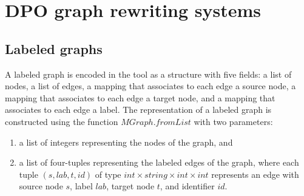\section{DPO graph rewriting systems}
\label{lyonparallel:sec:implementation_of_dpo_graph_rewriting_systems}
\subsection{Labeled graphs}
\label{lyonparallel:sec:labeled_graphs}
A labeled graph is encoded in the tool as a structure with five fields: a list of nodes, a list of edges, a mapping that associates to each edge a source node, a mapping that associates to each edge a target node, and a mapping that associates to each edge a label.
The representation of a labeled graph is constructed using the function \colorbox{Ivory2}{$MGraph.fromList$} with two parameters:
\begin{enumerate}
    \item a list of integers representing the nodes of the graph, and
    \item a list of four-tuples representing the labeled edges of the graph, where each tuple \colorbox{Ivory2}{$(s,lab,t,id)$} of type \colorbox{Ivory2}{$\textit{int}\times \textit{string}\times \textit{int}\times \textit{int}$} represents an edge with source node $s$, label $lab$, target node $t$, and identifier $id$.
\end{enumerate} 

